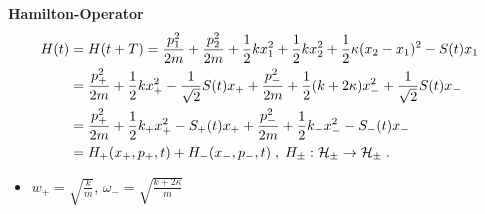 \begin{frame}
  \textbf{Hamilton-Operator}
  \begin{align}
    H(t) &= H(t+T) = \frac{p_1^2}{2m} + \frac{p_2^2}{2m} + \frac 1 2 kx_1^2 + \frac 1 2 kx_2^2 + \frac 1 2 \kappa(x_2-x_1)^2 - S(t)x_1 \notag\\
    &= \frac{p_+^2}{2m}+\frac{1}{2}kx_+^2-\frac{1}{\sqrt{2}}S(t)x_+  +
    \frac{p_-^2}{2m}+\frac{1}{2}(k+2\kappa)x_-^2+\frac{1}{\sqrt{2}}S(t)x_- \notag\\
    &= \frac{p_+^2}{2m}+\frac{1}{2}k_+x_+^2-S_+(t)x_+  +
    \frac{p_-^2}{2m}+\frac{1}{2}k_-x_-^2-S_-(t)x_- \notag\\
    &= H_+(x_+,p_+,t) + H_-(x_-,p_-,t) \;,\; H_\pm:\cal H_\pm \rightarrow \cal H_\pm \; .
    \label{gekoppelte_H_entkoppelt}
  \end{align}
  \begin{itemize}
    \item $w_+=\sqrt{\frac{k}{m}}$, $ \omega_-=\sqrt{\frac{k+2\kappa}{m}}$
  \end{itemize}
\end{frame}




